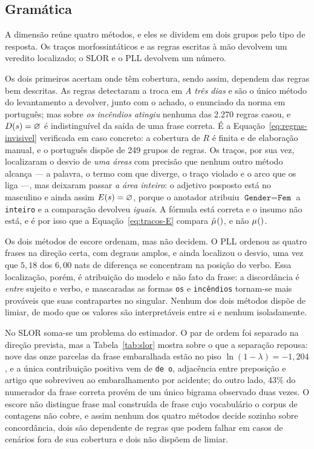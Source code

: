 \subsection{Gramática}
\label{disc:gramatica}

\indent\indent A dimensão reúne quatro métodos, e eles se dividem em dois grupos pelo tipo de resposta. Os
traços morfossintáticos e as regras escritas à mão devolvem um veredito localizado; o SLOR e o
PLL devolvem um número.

Os dois primeiros acertam onde têm cobertura, sendo assim, dependem das regras bem descritas.
 As regras detectaram a troca em \emph{A três dias} e são o único método do
levantamento a devolver, junto com o achado, o enunciado da norma em português; mas sobre
\emph{os incêndios atingiu} nenhuma das 2.270 regras casou, e $D(s) = \varnothing$ é
indistinguível da saída de uma frase correta. É a Equação~\ref{eq:regras-invisivel} verificada
em caso concreto: a cobertura de $R$ é finita e de elaboração manual, e o português dispõe de
249 grupos de regras. Os traços, por sua vez, localizaram o desvio de
\emph{uma áreas} com precisão que nenhum outro método alcança --- a palavra, o termo com que
diverge, o traço violado e o arco que os liga ---, mas deixaram passar \emph{a área inteiro}:
o adjetivo posposto está no masculino e ainda assim $E(s) = \varnothing$, porque o
anotador atribuiu $\texttt{Gender} = \texttt{Fem}$ a \texttt{inteiro} e a comparação devolveu
\emph{iguais}. A fórmula está correta e o insumo não está, e é por isso que a
Equação~\ref{eq:tracos-E} compara $\hat\mu_{}()$, e não $\mu_{}()$.

Os dois métodos de escore ordenam, mas não decidem. O PLL ordenou as quatro frases na direção
certa, com degraus amplos, e ainda localizou o desvio, uma vez que $5{,}18$ dos $6{,}00$ nats
de diferença se concentram na posição do verbo. Essa localização, porém, é atribuição do
modelo e não fato da frase: a discordância é \emph{entre} sujeito e verbo, e mascaradas as
formas \texttt{os} e \texttt{incêndios} tornam-se mais prováveis que suas contrapartes no
singular. Nenhum dos dois métodos dispõe de limiar, de modo que os valores são interpretáveis
entre si e nenhum isoladamente.

No SLOR soma-se um problema do estimador. O par de ordem foi separado na direção prevista, mas
a Tabela~\ref{tab:slor} mostra sobre o que a separação repousa: nove das onze parcelas da
frase embaralhada estão no piso $\ln(1-\lambda) = -1{,}204$, e a única contribuição positiva
vem de \texttt{de o}, adjacência entre preposição e artigo que sobreviveu ao embaralhamento
por acidente; do outro lado, 43\% do numerador da frase correta provém de um único bigrama
observado duas vezes. O escore não distingue frase mal construída de frase cujo vocabulário o
corpus de contagens não cobre, e assim nenhum dos quatro métodos decide sozinho sobre
concordância, dois são dependente de regras que podem falhar em casos de cenários 
fora de sua cobertura e dois não dispõem de limiar.



